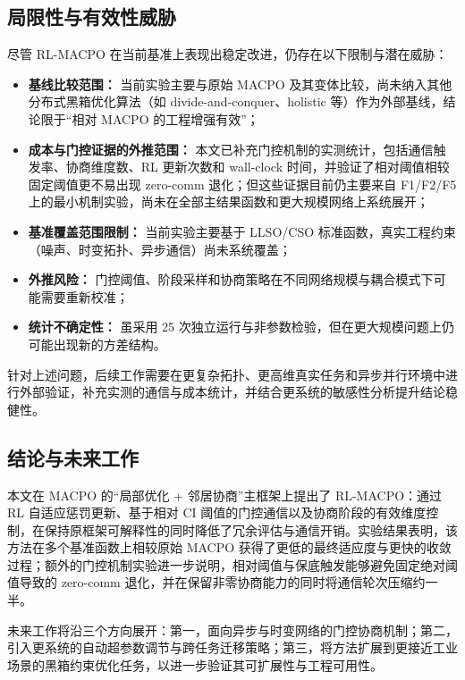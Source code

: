 \documentclass[12pt]{ctexart}
\begin{document}
\subsection{局限性与有效性威胁}

尽管 RL-MACPO 在当前基准上表现出稳定改进，仍存在以下限制与潜在威胁：
\begin{itemize}
\item \textbf{基线比较范围：} 当前实验主要与原始 MACPO 及其变体比较，尚未纳入其他分布式黑箱优化算法（如 divide-and-conquer、holistic 等）作为外部基线，结论限于“相对 MACPO 的工程增强有效”；
\item \textbf{成本与门控证据的外推范围：} 本文已补充门控机制的实测统计，包括通信触发率、协商维度数、RL 更新次数和 wall-clock 时间，并验证了相对阈值相较固定阈值更不易出现 zero-comm 退化；但这些证据目前仍主要来自 F1/F2/F5 上的最小机制实验，尚未在全部主结果函数和更大规模网络上系统展开；
\item \textbf{基准覆盖范围限制：} 当前实验主要基于 LLSO/CSO 标准函数，真实工程约束（噪声、时变拓扑、异步通信）尚未系统覆盖；
\item \textbf{外推风险：} 门控阈值、阶段采样和协商策略在不同网络规模与耦合模式下可能需要重新校准；
\item \textbf{统计不确定性：} 虽采用 25 次独立运行与非参数检验，但在更大规模问题上仍可能出现新的方差结构。
\end{itemize}

针对上述问题，后续工作需要在更复杂拓扑、更高维真实任务和异步并行环境中进行外部验证，补充实测的通信与成本统计，并结合更系统的敏感性分析提升结论稳健性。

\subsection{结论与未来工作}

本文在 MACPO 的“局部优化 + 邻居协商”主框架上提出了 RL-MACPO：通过 RL 自适应惩罚更新、基于相对 CI 阈值的门控通信以及协商阶段的有效维度控制，在保持原框架可解释性的同时降低了冗余评估与通信开销。实验结果表明，该方法在多个基准函数上相较原始 MACPO 获得了更低的最终适应度与更快的收敛过程；额外的门控机制实验进一步说明，相对阈值与保底触发能够避免固定绝对阈值导致的 zero-comm 退化，并在保留非零协商能力的同时将通信轮次压缩约一半。

未来工作将沿三个方向展开：第一，面向异步与时变网络的门控协商机制；第二，引入更系统的自动超参数调节与跨任务迁移策略；第三，将方法扩展到更接近工业场景的黑箱约束优化任务，以进一步验证其可扩展性与工程可用性。
\end{document}
